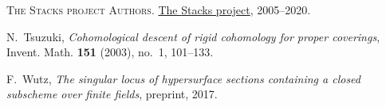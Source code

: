 \documentclass[11pt]{amsart}
\theoremstyle{definition}
\begin{document}
\begin{thebibliography}{10000000}
{\scshape {The {S}tacks project Authors}}.
\newblock \href {https://stacks.math.columbia.edu} {The {S}tacks project},
  2005--2020.

N.~Tsuzuki, \emph{Cohomological descent of rigid cohomology for
proper coverings}, Invent. Math. {\bf 151} (2003), no.~1, 101--133.

F.~Wutz, \emph{The singular locus of hypersurface sections
containing
  a closed subscheme over finite fields}, preprint, 2017.



\end{thebibliography}
\end{document}
